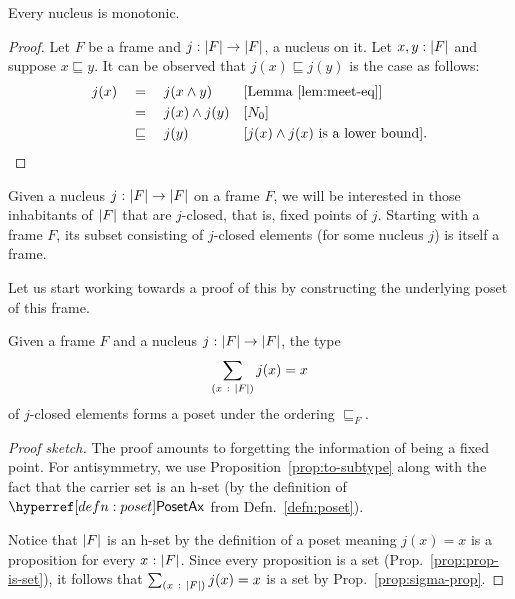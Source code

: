 \begin{prop}\label{prop:nucleus-mono}
  Every nucleus is monotonic.
\end{prop}
\begin{proof}
  Let $F$ be a frame and $j : \left| F \right| \rightarrow \left| F \right|$, a nucleus on it. Let
  $x, y:\left| F \right|$ and suppose $x \sqsubseteq y$. It can be observed that $j(x) \sqsubseteq j(y)$ is
  the case as follows:
  \begin{align*}
    j(x) &\quad=\quad j(x \wedge y)        && [\text{Lemma~\ref{lem:meet-eq}}]               \\
         &\quad=\quad j(x) \wedge j(y)     && [N_0]                                          \\
         &\quad\sqsubseteq\quad {j(y)}                && [\text{$j(x) \wedge j(x)$ is a lower bound}]  .
  \end{align*}
\end{proof}

Given a nucleus $j\hspace{0.1mm}:\hspace{0.1mm}\left| F \right| \rightarrow \left| F \right|$ on a frame $F$, we will be interested in
those inhabitants of $\left| F \right|$ that are $j$-closed, that is, fixed points of $j$. Starting
with a frame $F$, its subset consisting of $j$-closed elements (for some nucleus $j$) is
itself a frame.

Let us start working towards a proof of this by constructing the underlying poset of this
frame.
\begin{prop}\label{prop:fixed-point-poset}
  Given a frame $F$ and a nucleus $j\hspace{0.1mm}:\hspace{0.1mm}\left| F \right| \rightarrow \left| F \right|$, the type
  \begin{equation*}
    \sum_{(x~:~\left| F \right|)} j(x) = x
  \end{equation*}
   of $j$-closed elements forms a poset under the ordering $\sqsubseteq_F$.
\end{prop}
\begin{proof}[Proof sketch]
  The proof amounts to forgetting the information of being a fixed point. For
  antisymmetry, we use Proposition~\ref{prop:to-subtype} along with the fact that the
  carrier set is an h-set (by the definition of $\posetaxnm{}$ from
  Defn.~\ref{defn:poset}).

  Notice that $\left| F \right|$ is an h-set by the definition of a poset meaning $j(x) = x$ is a
  proposition for every $x\hspace{0.1mm}:\hspace{0.1mm}\left| F \right|$. Since every proposition is a set
  (Prop.~\ref{prop:prop-is-set}), it follows that $\sum_{(x~:~\left| F \right|)} j(x) = x$ is a
  set by Prop.~\ref{prop:sigma-prop}.
\end{proof}

